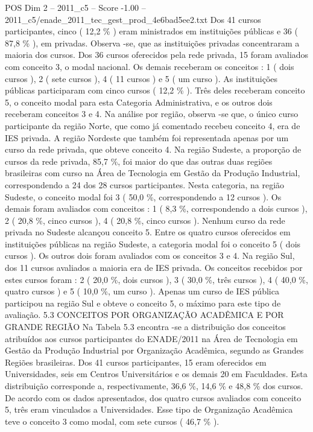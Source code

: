 \begin{textsample}{POS Dim 2 – 2011\_c5 – Score -1.00 – 2011\_c5/enade\_2011\_tec\_gest\_prod\_4e6bad5ee2.txt}
Dos 41 cursos participantes, cinco ( 12,2 \% ) eram ministrados em instituições públicas e 36 ( 87,8 \% ), em privadas.
Observa -se, que as instituições privadas concentraram a maioria dos cursos.
Dos 36 cursos oferecidos pela rede privada, 15 foram avaliados com conceito 3, o modal nacional.
Os demais receberam os conceitos : 1 ( dois cursos ), 2 ( sete cursos ), 4 ( 11 cursos ) e 5 ( um curso ).
As instituições públicas participaram com cinco cursos ( 12,2 \% ).
Três deles receberam conceito 5, o conceito modal para esta Categoria Administrativa, e os outros dois receberam conceitos 3 e 4.
Na análise por região, observa -se que, o único curso participante da região Norte, que como já comentado recebeu conceito 4, era de IES privada.
A região Nordeste que também foi representada apenas por um curso da rede privada, que obteve conceito 4.
Na região Sudeste, a proporção de cursos da rede privada, 85,7 \%, foi maior do que das outras duas regiões brasileiras com curso na Área de Tecnologia em Gestão da Produção Industrial, correspondendo a 24 dos 28 cursos participantes.
Nesta categoria, na região Sudeste, o conceito modal foi 3 ( 50,0 \%, correspondendo a 12 cursos ).
Os demais foram avaliados com conceitos : 1 ( 8,3 \%, correspondendo a dois cursos ), 2 ( 20,8 \%, cinco cursos ), 4 ( 20,8 \%, cinco cursos ).
Nenhum curso da rede privada no Sudeste alcançou conceito 5.
Entre os quatro cursos oferecidos em instituições públicas na região Sudeste, a categoria modal foi o conceito 5 ( dois cursos ).
Os outros dois foram avaliados com os conceitos 3 e 4.
Na região Sul, dos 11 cursos avaliados a maioria era de IES privada.
Os conceitos recebidos por estes cursos foram : 2 ( 20,0 \%, dois cursos ), 3 ( 30,0 \%, três cursos ), 4 ( 40,0 \%, quatro cursos ) e 5 ( 10,0 \%, um curso ).
Apenas um curso de IES pública participou na região Sul e obteve o conceito 5, o máximo para este tipo de avaliação. 5.3 CONCEITOS POR ORGANIZAÇÃO ACADÊMICA E POR GRANDE REGIÃO Na Tabela 5.3 encontra -se a distribuição dos conceitos atribuídos aos cursos participantes do ENADE/2011 na Área de Tecnologia em Gestão da Produção Industrial por Organização Acadêmica, segundo as Grandes Regiões brasileiras.
Dos 41 cursos participantes, 15 eram oferecidos em Universidades, seis em Centros Universitários e os demais 20 em Faculdades.
Esta distribuição corresponde a, respectivamente, 36,6 \%, 14,6 \% e 48,8 \% dos cursos.
De acordo com os dados apresentados, dos quatro cursos avaliados com conceito 5, três eram vinculados a Universidades.
Esse tipo de Organização Acadêmica teve o conceito 3 como modal, com sete cursos ( 46,7 \% ).

\end{textsample}
